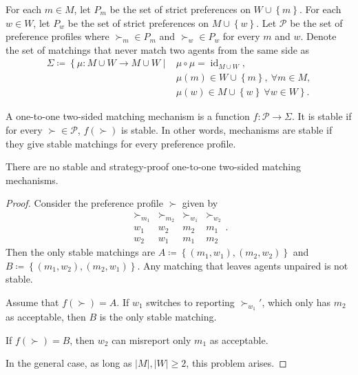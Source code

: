 \begin{notation}
	For each $m \in M$, let $P_m$ be the set of strict preferences on $W \cup \left\{m\right\}$. For each $w \in W$, let $P_w$ be the set of strict preferences on $M \cup \left\{w\right\}$.
	Let $\mathscr{P}$ be the set of preference profiles where $\succ_m \in P_m$ and $\succ_w \in P_w$ for every $m$ and $w$.
	Denote the set of matchings that never match two agents from the same side as
	\begin{align*}
		\Sigma \coloneqq  \left\{\mu: M \cup W \to M \cup W \mid \right.&\mu\circ\mu = \operatorname{id}_{M \cup W}, \\
																 &\mu(m) \in W \cup \left\{m\right\}, \ \forall m \in M,\\
																 &\left.\mu(w) \in M \cup \left\{w\right\} \ \forall w \in W\right\}
	.\end{align*}
\end{notation}
\boxednote{Tentative grades --- A: 39+; A-: [33,39); B+: [27,33); B: [21,27); B-: [15,21).} 

\begin{definition}[Mechanism]
	A one-to-one two-sided matching mechanism is a function $f: \mathscr{P} \to \Sigma$. It is stable if for every $\succ \in \mathscr{P}$, $f(\succ)$ is stable. In other words, mechanisms are stable if they give stable matchings for every preference profile.
\end{definition}

\begin{proposition}
	There are no stable and strategy-proof one-to-one two-sided matching mechanisms.
\end{proposition}
\begin{proof}
	Consider the preference profile $\succ$ given by
	\[
		\begin{array}{cccc}
			\succ_{m_1} & \succ_{m_2} & \succ_{w_1} & \succ_{w_2} \\
			\hline
			w_1 & w_2 & m_2 & m_1 \\
			w_2 & w_1 & m_1 & m_2
		\end{array}
	.\] Then the only stable matchings are $A \coloneqq \left\{(m_1,w_1),(m_2,w_2)\right\}$ and $B\coloneqq \left\{(m_1,w_2), (m_2,w_1)\right\}$. Any matching that leaves agents unpaired is not stable.

	Assume that $f(\succ) = A$.
	If $w_1$ switches to reporting $\succ_{w_1}'$, which only has $m_2$ as acceptable, then $B$ is the only stable matching.

	If $f(\succ) = B$, then $w_2$ can misreport only $m_1$ as acceptable.
	
	In the general case, as long as $\left| M \right|,\left| W \right| \ge 2$, this problem arises.
\end{proof}


